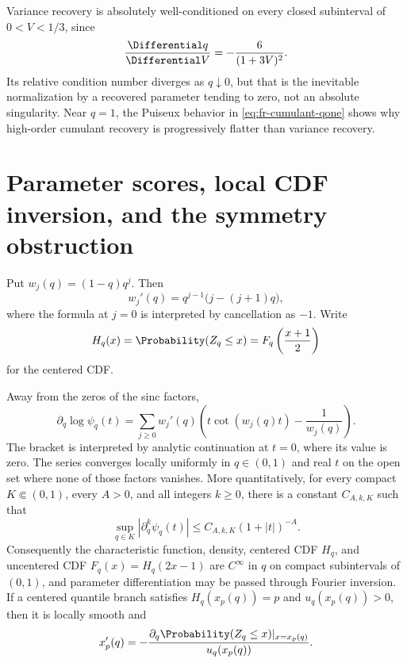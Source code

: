 Variance recovery is absolutely well-conditioned on every closed
subinterval of \(0<V<1/3\), since
\[
 \frac{\Differential q}{\Differential V}=-\frac6{(1+3V)^2}.
\]
Its relative condition number diverges as \(q\downarrow0\), but that is the
inevitable normalization by a recovered parameter tending to zero, not an
absolute singularity.  Near \(q=1\), the Puiseux behavior in
\cref{eq:fr-cumulant-qone} shows why high-order cumulant recovery is
progressively flatter than variance recovery.

\section{Parameter scores, local CDF inversion, and the symmetry obstruction}
\label{sec:fr-cdf-inverse}

Put \(w_j(q)=(1-q)q^j\).  Then
\[
 w_j'(q)=q^{j-1}\bigl(j-(j+1)q\bigr),
\]
where the formula at \(j=0\) is interpreted by cancellation as \(-1\).
Write
\[
 H_q(x)=\Probability(Z_q\le x)=F_q\left(\frac{x+1}{2}\right)
\]
for the centered CDF.

\begin{proposition}
\label{prop:fr-fourier-score}
Away from the zeros of the sinc factors,
\begin{equation}
 \partial_q\log\psi_q(t)
 =\sum_{j\ge0}w_j'(q)
 \left(t\cot(w_j(q)t)-\frac1{w_j(q)}\right).
 \label{eq:fr-fourier-score}
\end{equation}
The bracket is interpreted by analytic continuation at \(t=0\), where its
value is zero.
The series converges locally uniformly in \(q\in(0,1)\) and real \(t\) on the
open set where none of those factors vanishes.  More quantitatively, for every
compact \(K\Subset(0,1)\), every \(A>0\), and all integers \(k\ge0\), there is
a constant \(C_{A,k,K}\) such that
\begin{equation}
 \sup_{q\in K}\left|\partial_q^k\psi_q(t)\right|
 \le C_{A,k,K}(1+|t|)^{-A}.
 \label{eq:fr-q-derivative-rapid}
\end{equation}
Consequently the characteristic function, density, centered CDF \(H_q\), and
uncentered CDF \(F_q(x)=H_q(2x-1)\) are \(C^\infty\) in \(q\) on compact
subintervals of \((0,1)\), and parameter differentiation may be passed
through Fourier inversion.  If a centered quantile branch satisfies
\(H_q(x_p(q))=p\) and \(u_q(x_p(q))>0\), then it is locally smooth and
\begin{equation}
 x_p'(q)=-\frac{\partial_q\Probability(Z_q\le x)|_{x=x_p(q)}}{u_q(x_p(q))}.
 \label{eq:fr-quantile-sensitivity}
\end{equation}
\end{proposition}

